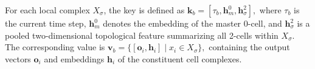 For each local complex \( X_{\sigma} \), the key is defined as 
$
\bm{k}_b = [\tau_b, \bm{h}_m^0, \bm{h}_{\sigma}^2],
$
where \(\tau_b\) is the current time step, \(\bm{h}_m^0\) denotes the embedding of the master 0-cell, and \(\bm{h}_{\sigma}^2\) is a pooled two-dimensional topological feature summarizing all 2-cells within \( X_{\sigma} \). 
The corresponding value is
$
\bm{v}_b = \{ [\bm{o}_i, \bm{h}_i] \mid x_i \in X_{\sigma} \},
$
containing the output vectors \( \bm{o}_i \) and embeddings \( \bm{h}_i \) of the constituent cell complexes.


